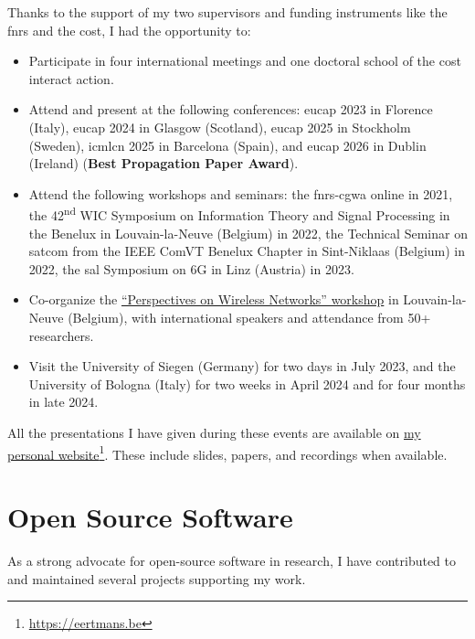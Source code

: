 \begin{refsection}
  Thanks to the support of my two supervisors and funding instruments like the \gls{fnrs} and the \gls{cost}, I had the opportunity to:
  \begin{itemize}
    \item Participate in four international meetings and one doctoral school of the \gls{cost} \gls{interact} action.
    \item Attend and present at the following conferences: \gls{eucap} 2023 in Florence (Italy), \gls{eucap} 2024 in Glasgow (Scotland), \gls{eucap} 2025 in Stockholm (Sweden), \gls{icmlcn} 2025 in Barcelona (Spain), and \gls{eucap} 2026 in Dublin (Ireland) (\textbf{Best Propagation Paper Award}).
    \item Attend the following workshops and seminars: the \gls{fnrs}-\gls{cgwa} online in 2021, the 42\textsuperscript{nd} WIC Symposium on Information Theory and Signal Processing in the Benelux in Louvain-la-Neuve (Belgium) in 2022, the Technical Seminar on satcom from the IEEE ComVT Benelux Chapter in Sint-Niklaas (Belgium) in 2022, the \gls{sal} Symposium on 6G in Linz (Austria) in 2023.
    \item Co-organize the \href{https://sites.google.com/view/pwn2025}{\enquote{Perspectives on Wireless Networks} workshop} in Louvain-la-Neuve (Belgium), with international speakers and attendance from 50+ researchers.
    \item Visit the University of Siegen (Germany) for two days in July 2023, and the University of Bologna (Italy) for two weeks in April 2024 and for four months in late 2024.
  \end{itemize}

  All the presentations I have given during these events are available on \href{https://eertmans.be/tags/presentation}{my personal website}\footnote{\url{https://eertmans.be}}. These include slides, papers, and recordings when available.

  \clearpage
  \section{Open Source Software}

  As a strong advocate for open-source software in research, I have contributed to and maintained several projects supporting my work.


\end{refsection}
